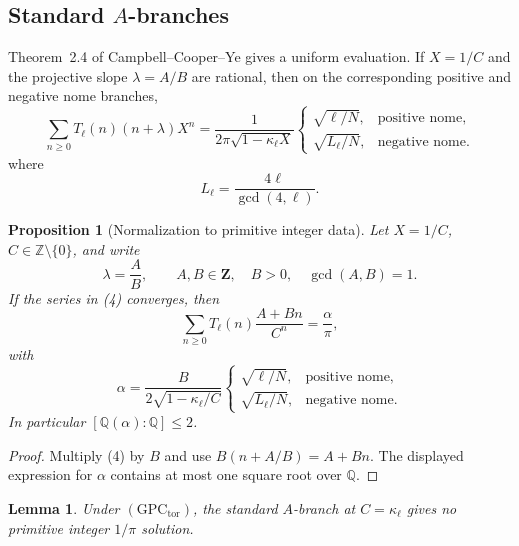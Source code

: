 \documentclass[11pt,a4paper]{amsart} %
\newtheorem{lemma}[theorem]{Lemma}
\newtheorem{proposition}[theorem]{Proposition}
\theoremstyle{definition}
\newcommand{\Q}{\mathbb Q}
\begin{document}
\subsection*{Standard \(A\)-branches}
Theorem~2.4 of Campbell--Cooper--Ye gives a uniform evaluation. If
\(X=1/C\) and the projective slope \(\lambda=A/B\) are rational, then on the
corresponding positive and negative nome branches,
\[
\sum_{n\ge0}T_\ell(n)(n+\lambda)X^n
=
\frac1{2\pi\sqrt{1-\kappa_\ell X}}
\begin{cases}
\sqrt{\ell/N},&\text{positive nome},\\[1mm]
\sqrt{L_\ell/N},&\text{negative nome}.
\end{cases}
\tag{4}
\]
where
\[
L_\ell=\frac{4\ell}{\gcd(4,\ell)}.
\]

\begin{proposition}[Normalization to primitive integer data]
\label{prop:normalizeA}
Let \(X=1/C\), \(C\in\mathbb Z\setminus\{0\}\), and write
\[
\lambda=\frac AB,\qquad
A,B\in\mathbf Z,\quad B>0,\quad \gcd(A,B)=1.
\]
If the series in (4) converges, then
\[
\sum_{n\ge0}T_\ell(n)\frac{A+Bn}{C^n}
=\frac{\alpha}\pi,
\]
with
\[
\alpha=
\frac{B}{2\sqrt{1-\kappa_\ell/C}}
\begin{cases}
\sqrt{\ell/N},&\text{positive nome},\\[1mm]
\sqrt{L_\ell/N},&\text{negative nome}.
\end{cases}
\tag{5}
\]
In particular \([\Q(\alpha):\Q]\le2\).
\end{proposition}

\begin{proof}
Multiply (4) by \(B\) and use \(B(n+A/B)=A+Bn\). The displayed expression
for \(\alpha\) contains at most one square root over \(\Q\).
\end{proof}

\begin{lemma}\label{lem:Apositiveboundary}
Under \((\mathrm{GPC}_{\mathrm{tor}})\), the standard \(A\)-branch at
\(C=\kappa_\ell\) gives no primitive integer \(1/\pi\) solution.
\end{lemma}
\end{document}
